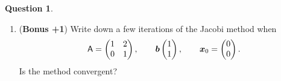 \documentclass[11pt]{article}
\theoremstyle{definition}
\newtheorem{question}{Question}
\begin{document}
\begin{question}
\begin{enumerate}
        \item
            (\textbf{Bonus +1})
            Write down a few iterations of the Jacobi method when
            \[
                \mathsf A =
                \begin{pmatrix}
                    1 & 2 \\
                    0 & 1
                \end{pmatrix},
                \qquad
                \mathbf{\boldsymbol{b}}
                \begin{pmatrix}
                    1 \\
                    1
                \end{pmatrix},
                \qquad
                \mathbf{\boldsymbol{x}}_0 =
                \begin{pmatrix}
                    0 \\
                    0
                \end{pmatrix}.
            \]
            Is the method convergent?
    \end{enumerate}
\end{question}
\end{document}
